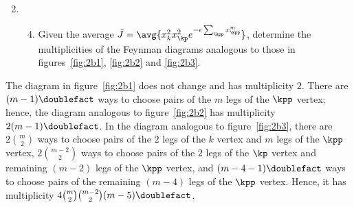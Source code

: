 \begin{enumerate}[leftmargin=0cm]
  \setcounter{enumi}{1}
  \item
        \begin{enumerate}
          \setcounter{enumii}{3}
          \item \label{2d}
                Given the average $\tilde{J} = \avg{x_k^2 x_\kp^2 e^{- \epsilon \sum_\kpp
                        x_\kpp^m }}$, determine the multiplicities of the Feynman diagrams analogous to
                those in figures~\ref{fig:2b1}, \ref{fig:2b2} and \ref{fig:2b3}.
        \end{enumerate}
\end{enumerate}

The diagram in figure~\ref{fig:2b1} does not change and has multiplicity $2$.
There are $(m - 1)\doublefact$ ways to choose pairs of the $m$ legs of the
$\kpp$ vertex; hence, the diagram analogous to figure~\ref{fig:2b2} has
multiplicity $2 (m - 1)\doublefact$.
In the diagram analogous to figure~\ref{fig:2b3}, there are $2 \binom{m}{2}$
ways to choose pairs of the $2$ legs of the $k$ vertex and $m$ legs of the
$\kpp$ vertex, $2 \binom{m - 2}{2}$ ways to choose pairs of the $2$ legs of the
$\kp$ vertex and remaining $(m - 2)$ legs of the $\kpp$ vertex, and $(m - 4 -
  1)\doublefact$ ways to choose pairs of the remaining $(m - 4)$ legs of the
$\kpp$ vertex.
Hence, it has multiplicity $4 \binom{m}{2} \binom{m - 2}{2} (m -
  5)\doublefact$.
